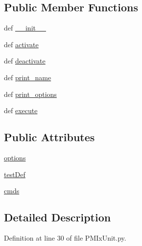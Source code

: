 \subsection*{Public Member Functions}
\begin{DoxyCompactItemize}
\item 
def \hyperlink{class_p_m_ix_unit_1_1_p_m_ix_unit_a01b0f667b854dc0d7051c071d01f2cdb}{\-\_\-\-\_\-init\-\_\-\-\_\-}
\item 
def \hyperlink{class_p_m_ix_unit_1_1_p_m_ix_unit_af9eb3845f804e5cff57f0b96a5c1d912}{activate}
\item 
def \hyperlink{class_p_m_ix_unit_1_1_p_m_ix_unit_a77590898cef9e5d560857e25a00ee287}{deactivate}
\item 
def \hyperlink{class_p_m_ix_unit_1_1_p_m_ix_unit_a64943a4530694aa835f021d0442fc8dd}{print\-\_\-name}
\item 
def \hyperlink{class_p_m_ix_unit_1_1_p_m_ix_unit_a716d70327c8f43718a74e99e87eb05e1}{print\-\_\-options}
\item 
def \hyperlink{class_p_m_ix_unit_1_1_p_m_ix_unit_a692047ba1b5639b1c02f25922cd014bb}{execute}
\end{DoxyCompactItemize}
\subsection*{Public Attributes}
\begin{DoxyCompactItemize}
\item 
\hyperlink{class_p_m_ix_unit_1_1_p_m_ix_unit_a6c56979e7226a414874653b3e7a17dd8}{options}
\item 
\hyperlink{class_p_m_ix_unit_1_1_p_m_ix_unit_a08b01eaf2867a0a02f8598018739e843}{test\-Def}
\item 
\hyperlink{class_p_m_ix_unit_1_1_p_m_ix_unit_a1130f07074aeff223235a147440868c4}{cmds}
\end{DoxyCompactItemize}


\subsection{Detailed Description}


Definition at line 30 of file P\-M\-Ix\-Unit.\-py.



